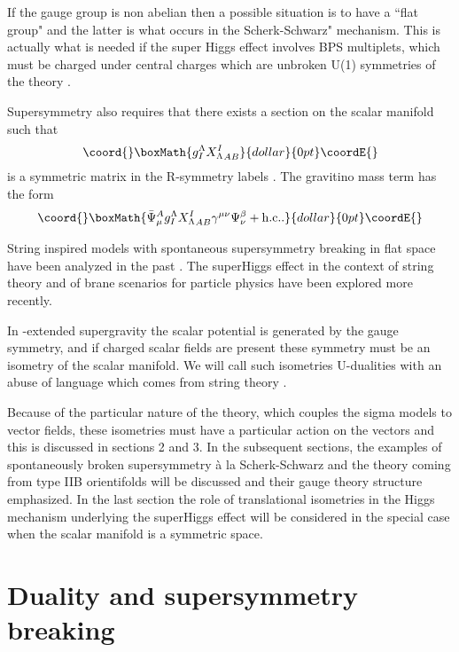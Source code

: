 \documentclass[a4paper,12pt]{article}
\begin{document}
If the gauge group is non abelian then a possible situation is to have a ``flat group" and the latter is what 
occurs in 
the Scherk-Schwarz" mechanism. This is actually what is needed if the super Higgs effect involves BPS 
multiplets, which 
must be charged under central charges which are unbroken U(1) symmetries of the theory \cite{adfl1}.

Supersymmetry also requires that there exists a section \coordHE{} on the scalar manifold such that 
$$\coord{}\boxMath{g_I^\Lambda{X^I_\Lambda
}_{AB}}{dollar}{0pt}\coordE{}$$
is a symmetric matrix in the  R-symmetry labels \coordHE{}. The gravitino mass term has the form 
$$\coord{}\boxMath{\bar \Psi_\mu^Ag_I^\Lambda{X^I_\Lambda}_{AB}\gamma^{\mu\nu}\Psi_\nu^\beta +\mathrm{h.c.}.}{dollar}{0pt}\coordE{}$$

String inspired models with spontaneous supersymmetry breaking in flat space \cite{ckvpdfwg} have been analyzed 
in the past \cite{fkpz}. The superHiggs effect in the context of string theory \cite{bkl} and of brane scenarios 
for particle physics \cite{mp} have been explored more recently. 

In \coordHE{}-extended supergravity the scalar potential is generated by the gauge symmetry, and if charged scalar 
fields are 
present these symmetry must be an isometry of the scalar manifold. We will call such isometries U-dualities 
with an 
abuse of language which comes from string theory \cite{ht}.

Because of the particular nature of the theory, which couples the sigma models to vector fields, these 
isometries must 
have a particular action on the vectors and this is discussed in sections 2 and 3. In the subsequent sections, 
the 
examples of \coordHE{} spontaneously broken supersymmetry \`a la Scherk-Schwarz and the \coordHE{} theory coming from 
type IIB 
orientifolds will be discussed and their gauge theory structure emphasized. In the last section the role of 
translational 
isometries in the Higgs mechanism underlying the superHiggs effect will be considered in the special case when 
the 
scalar manifold is a symmetric space.




\section{Duality and supersymmetry breaking}
\end{document}
